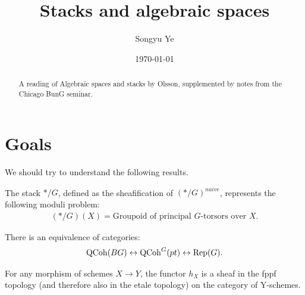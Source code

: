 \documentclass[12pt]{article}
\begin{document}
\rhead{\today}
\cfoot{\thepage}

\title{Stacks and algebraic spaces}

\author{Songyu Ye}
\date{\today}
\maketitle


\begin{abstract}
    A reading of Algebraic spaces and stacks by Olsson, supplemented by notes from the Chicago BunG seminar.
\end{abstract}

\tableofcontents
\section{Goals}
We should try to understand the following results.
\begin{proposition}
    The stack $*/G$, defined as the sheafification of $(*/G)^{naive}$, represents the following moduli problem:
    \begin{align*}
        (*/G)(X) = \text{Groupoid of principal $G$-torsors over $X$}.
    \end{align*}
\end{proposition}

\begin{proposition}
    There is an equivalence of categories:
    \begin{align*}
        \operatorname{QCoh}(BG) \leftrightarrow \operatorname{QCoh}^G(pt) \leftrightarrow \operatorname{Rep}(G).
    \end{align*}
\end{proposition}
\begin{theorem}
    For any morphism of schemes $X\to Y$, the functor $h_X$ is a sheaf in the fppf topology (and therefore also in the etale topology) on the category of Y-schemes.
\end{theorem}
\end{document}
